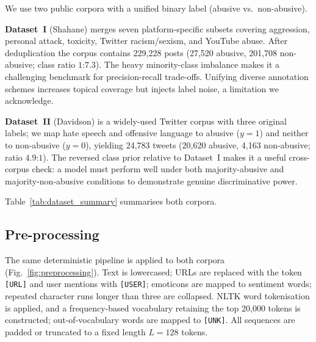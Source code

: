 \documentclass[10pt,twocolumn,a4paper]{article}
\begin{document}
We use two public corpora with a unified binary label (abusive vs.\ non-abusive).

\textbf{Dataset~I} (Shahane) \citep{ref10} merges seven platform-specific subsets covering aggression, personal attack, toxicity, Twitter racism/sexism, and YouTube abuse. After deduplication the corpus contains 229,228 posts (27,520 abusive, 201,708 non-abusive; class ratio $1$:$7.3$). The heavy minority-class imbalance makes it a challenging benchmark for precision-recall trade-offs. Unifying diverse annotation schemes increases topical coverage but injects label noise, a limitation we acknowledge.

\textbf{Dataset~II} (Davidson) \citep{ref11} is a widely-used Twitter corpus with three original labels; we map hate speech and offensive language to abusive ($y=1$) and neither to non-abusive ($y=0$), yielding 24,783 tweets (20,620 abusive, 4,163 non-abusive; ratio $4.9$:$1$). The reversed class prior relative to Dataset~I makes it a useful cross-corpus check: a model must perform well under both majority-abusive and majority-non-abusive conditions to demonstrate genuine discriminative power.

Table~\ref{tab:dataset_summary} summarises both corpora.

\begin{table}[!t]
\caption{Dataset statistics.}
\label{tab:dataset_summary}
\centering
{}
\end{table}

\subsection{Pre-processing}\label{subsec:preprocessing}

The same deterministic pipeline is applied to both corpora (Fig.~\ref{fig:preprocessing}). Text is lowercased; URLs are replaced with the token \texttt{[URL]} and user mentions with \texttt{[USER]}; emoticons are mapped to sentiment words; repeated character runs longer than three are collapsed. NLTK word tokenisation is applied, and a frequency-based vocabulary retaining the top 20,000 tokens is constructed; out-of-vocabulary words are mapped to \texttt{[UNK]}. All sequences are padded or truncated to a fixed length $L{=}128$ tokens.
\end{document}
